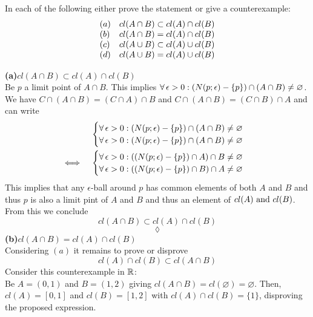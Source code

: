 \subsection{}
\begin{tcolorbox}
In each of the following either prove the statement or give a
counterexample:
\begin{align*}
\begin{array}{l l}
(a)&cl (A\cap B) \subset cl(A)\cap cl (B)\\
(b)&cl (A\cap B) = cl(A)\cap cl (B)\\
(c)&cl (A\cup B) \subset cl(A)\cup cl (B)\\
(d)&cl (A\cup B) = cl(A)\cup cl (B)
\end{array}
\end{align*}
\end{tcolorbox}
\textbf{(a)$cl (A\cap B) \subset cl(A)\cap cl (B)$\\}
Be $p$ a limit point of $A\cap B$. This implies $\forall\,\epsilon >0: \left(N(p;\epsilon)-\{p\}\right)\cap(A\cap B)\neq \varnothing$. We have $C\cap\left(A\cap B\right)= \left(C\cap A\right)\cap B$ and $C\cap\left(A\cap B\right)= \left(C\cap B\right)\cap A$ and can write
\begin{align*}
&\begin{cases}
\forall\,\epsilon >0: \left(N(p;\epsilon)-\{p\}\right)\cap(A\cap B)\neq \varnothing\\
\forall\,\epsilon >0: \left(N(p;\epsilon)-\{p\}\right)\cap(A\cap B)\neq \varnothing
\end{cases}\\
\iff\quad &\begin{cases}
\forall\,\epsilon >0: \left(\left(N(p;\epsilon)-\{p\}\right)\cap A\right)\cap B\neq \varnothing\\
\forall\,\epsilon >0: \left(\left(N(p;\epsilon)-\{p\}\right)\cap B\right)\cap A\neq \varnothing
\end{cases}\\
\end{align*}
This implies that any $\epsilon$-ball around $p$ has common elements of both $A$ and $B$ and thus $p$ is also a limit pint of $A$ and $B$ and thus an element of $cl(A)\text{ and } cl(B)$. From this we conclude
$$cl (A\cap B) \subset cl(A)\cap cl (B)$$
$$\lozenge$$
\textbf{(b)$cl (A\cap B) = cl(A)\cap cl (B)$\\}
Considering $(a)$ it remains to prove or disprove
$$cl(A)\cap cl (B)\subset cl (A\cap B)$$
Consider this counterexample in $\mathbb{R}$:\\
Be $A=(0,1)$ and $B=(1,2)$ giving $cl(A\cap B)=cl(\varnothing)=\varnothing$. Then, $cl(A)=[0,1]$ and $cl(B)=[1,2]$ with $cl(A)\cap cl(B)=\{1\}$, disproving the proposed expression.
